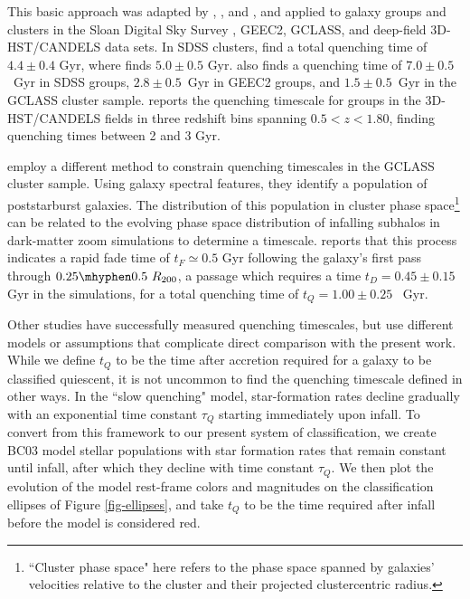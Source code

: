 This basic approach was adapted by \citet{Wetzel:2013aa}, \citet{Balogh:2016aa}, and \cite{Fossati:2017aa}, and applied to galaxy groups and clusters in the Sloan Digital Sky Survey \citep[SDSS,][]{York:2000aa}, GEEC2, GCLASS, and deep-field 3D-HST/CANDELS \citep{Grogin:2011aa,Koekemoer:2011aa,Brammer:2012aa} data sets.
In SDSS clusters, \citet{Wetzel:2013aa} find a total quenching time of $4.4 \pm 0.4$ Gyr, where \citet{Balogh:2016aa} finds $5.0\pm0.5$ Gyr.
\citet{Balogh:2016aa} also finds a quenching time of $7.0 \pm 0.5$~Gyr in SDSS groups, $2.8 \pm 0.5$~Gyr in GEEC2 groups, and $1.5 \pm 0.5$~Gyr in the GCLASS cluster sample.
\citet{Fossati:2017aa} reports the quenching timescale for groups in the 3D-HST/CANDELS fields in three redshift bins spanning $0.5 < z < 1.80$, finding quenching times between 2 and 3 Gyr.

\citet{Muzzin:2014aa} employ a different method to constrain quenching timescales in the GCLASS cluster sample.
Using galaxy spectral features, they identify a population of poststarburst galaxies.
The distribution of this population in cluster phase space\footnote{``Cluster phase space" here refers to the phase space spanned by galaxies' velocities relative to the cluster and their projected clustercentric radius.} can be related to the evolving phase space distribution of infalling subhalos in dark-matter zoom simulations to determine a timescale.
\citet{Muzzin:2014aa} reports that this process indicates a rapid fade time of $t_F \simeq 0.5$ Gyr following the galaxy's first pass through $0.25\mhyphen0.5~ R_{200}$, a passage which requires a time $t_D=0.45\pm0.15$~ Gyr in the simulations, for a total quenching time of $t_Q=1.00\pm0.25$~ Gyr.

Other studies have successfully measured quenching timescales, but use different models or assumptions that complicate direct comparison with the present work.
While we define $t_Q$ to be the time after accretion required for a galaxy to be classified quiescent, it is not uncommon to find the quenching timescale defined in other ways.
In the ``slow quenching" model, star-formation rates decline gradually with an exponential time constant $\tau_Q$ starting immediately upon infall.
To convert from this framework to our present system of classification, we create BC03 model stellar populations with star formation rates that remain constant until infall, after which they decline with time constant $\tau_Q$.
We then plot the evolution of the model rest-frame colors and magnitudes on the classification ellipses of Figure \ref{fig-ellipses}, and take $t_Q$ to be the time required after infall before the model is considered red.

